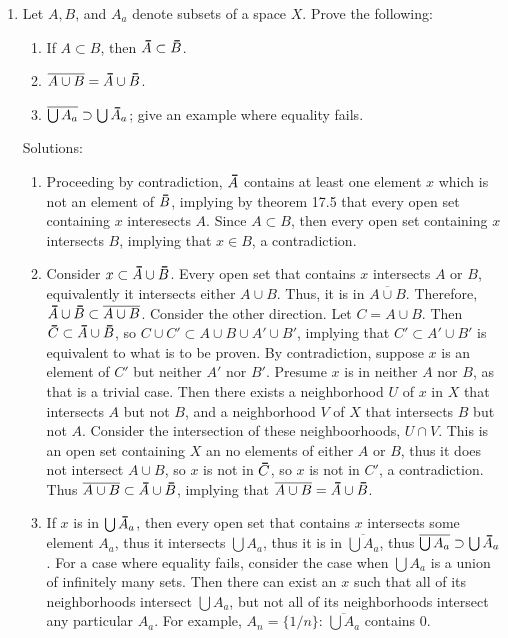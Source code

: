 \documentclass[12pt,letterpaper]{article}
\newcommand{\n}{\break}
\newcommand\thickbar[1]{\accentset{\rule{.4em}{.8pt}}{#1}}
\let\bar\thickbar
\begin{document}
\begin{enumerate}
  \item Let $A, B$, and $A_a$ denote subsets of a space $X$. Prove the following: 
  \begin{enumerate}
    \item If $A\subset B$, then $\bar{A}\subset\bar{B}$. 
    \item $\overline{A\cup B} = \bar{A}\cup \bar{B}$.
    \item $\overline{\bigcup A_a} \supset \bigcup \bar{A}_a$; give an example where equality fails.
  \end{enumerate}
  Solutions:
  \begin{enumerate}
    \item Proceeding by contradiction, $\bar{A}$ contains at least one element $x$ which is not an element of $\bar{B}$, implying by theorem 17.5 that every open set containing $x$ interesects $A$. Since $A\subset B$, then every open set containing $x$ intersects $B$, implying that $x\in B$, a contradiction.
    \item Consider $x\subset \bar{A}\cup\bar{B}$. Every open set that contains $x$ intersects $A$ or $B$, equivalently it intersects either $A\cup B$. Thus, it is in $\overline{A\cup B}$. Therefore, $\bar{A}\cup\bar{B} \subset \overline{A\cup B}$.\n
    \indent Consider the other direction. Let $C=A\cup B$. Then $\bar{C}\subset\bar{A}\cup\bar{B}$, so $C\cup C' \subset A \cup B \cup A' \cup B'$, implying that $C' \subset A' \cup B'$ is equivalent to what is to be proven. By contradiction, suppose $x$ is an element of $C'$ but neither $A'$ nor $B'$. Presume $x$ is in neither $A$ nor $B$, as that is a trivial case. Then there exists a neighborhood $U$ of $x$ in $X$ that intersects $A$ but not $B$, and a neighborhood $V$ of $X$ that intersects $B$ but not $A$. Consider the intersection of these neighboorhoods, $U\cap V$. This is an open set containing $X$ an no elements of either $A$ or $B$, thus it does not intersect $A\cup B$, so $x$ is not in $\bar{C}$, so $x$ is not in $C'$, a contradiction. Thus $\overline{A\cup B}\subset \bar{A}\cup\bar{B}$, implying that $\overline{A\cup B}=\bar{A}\cup\bar{B}$.
    \item If $x$ is in $\bigcup \bar{A}_a$, then every open set that contains $x$ intersects some element $A_a$, thus it intersects $\bigcup A_a$, thus it is in $\overline{\bigcup A_a}$, thus $\overline{\bigcup A_a} \supset\bigcup\bar{A}_a$. For a case where equality fails, consider the case when $\bigcup A_a$ is a union of infinitely many sets. Then there can exist an $x$ such that all of its neighborhoods intersect $\bigcup A_a$, but not all of its neighborhoods intersect any particular $A_a$. For example, $A_n=\{1/n\}$: $\overline{\bigcup A_a}$ contains 0.

\end{enumerate}
\end{enumerate}
\end{document}
